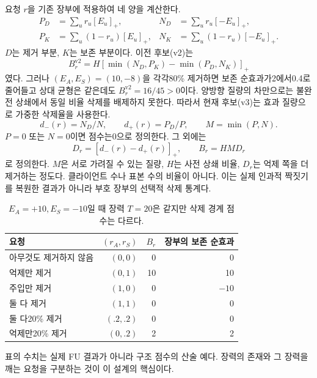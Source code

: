 \documentclass[10pt,a4paper]{article}
\begin{document}
요청 $r$을 기존 장부에 적용하여 네 양을 계산한다.
\begin{align}
 P_D&=\sum_u r_u[E_u]_+,&N_D&=\sum_u r_u[-E_u]_+,\\
 P_K&=\sum_u(1-r_u)[E_u]_+,&N_K&=\sum_u(1-r_u)[-E_u]_+.
\end{align}
$D$는 제거 부분, $K$는 보존 부분이다. 이전 후보(v2)는
\begin{equation}
 B_r^{\mathrm{v2}}=H[\min(N_D,P_K)-\min(P_D,N_K)]_+
\end{equation}
였다. 그러나 $(E_A,E_S)=(10,-8)$을 각각80\% 제거하면 보존 순효과가2에서0.4로
줄어들고 상대 균형은 같은데도 $B_r^{\mathrm{v2}}=16/45>0$이다.
양방향 질량의 차만으로는 불완전 상쇄에서 동일 비율 삭제를 배제하지 못한다.
따라서 현재 후보(v3)는 효과 질량으로 가중한 삭제율을 사용한다.
\begin{equation}
 d_-(r)=N_D/N,\qquad d_+(r)=P_D/P,\qquad M=\min(P,N).
\end{equation}
$P=0$ 또는 $N=0$이면 점수는0으로 정의한다. 그 외에는
\begin{equation}\label{eq:boundary}
 D_r=[d_-(r)-d_+(r)]_+,\qquad B_r=H M D_r
\end{equation}
로 정의한다. $M$은 서로 가려질 수 있는 질량, $H$는 사전 상쇄 비율,
$D_r$는 억제 쪽을 더 제거하는 정도다. 클라이언트 수나 표본 수의 비율이 아니다.
이는 실제 인과적 짝짓기를 복원한 결과가 아니라 부호 장부의 선택적 삭제 통계다.

\begin{table}[ht]\centering\small
\caption{$E_A=+10,E_S=-10$일 때 장력 $T=20$은 같지만 삭제 경계 점수는 다르다.}
\begin{tabular}{lrrr}\toprule
요청 & $(r_A,r_S)$ & $B_r$ & 장부의 보존 순효과\\\midrule
아무것도 제거하지 않음 & $(0,0)$ & 0 & 0\\
억제만 제거 & $(0,1)$ & 10 & 10\\
주입만 제거 & $(1,0)$ & 0 & $-10$\\
둘 다 제거 & $(1,1)$ & 0 & 0\\
둘 다20\% 제거 & $(.2,.2)$ & 0 & 0\\
억제만20\% 제거 & $(0,.2)$ & 2 & 2\\\bottomrule
\end{tabular}
\end{table}
표의 수치는 실제 FU 결과가 아니라 구조 점수의 산술 예다.
장력의 존재와 그 장력을 깨는 요청을 구분하는 것이 이 설계의 핵심이다.
\end{document}
